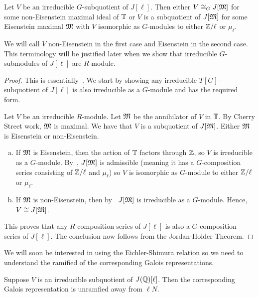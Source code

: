 \documentclass{article}
\begin{document}
\begin{theorem}\label{theorem:irreducible_G_sub}
    Let $V$ be an irreducible $G$-subquotient of $J[\ell]$. Then either $V\cong_G
    J[\mathfrak{M}]$ for some non-Eisenstein maximal ideal of $\mathbb{T}$ or $V$ is a
    subquotient of $J[\mathfrak{M}]$ for some Eisenstein maximal $\mathfrak{M}$ with $V$
    isomorphic as $G$-modules to either $\mathbb{Z}/\ell$ or $\mu_\ell$.

    We will call $V$ non-Eisenstein in the first case and Eisenstein in the
    second case. This terminology will be justified later when we show that
    irreducible $G$-submodules of $J[\ell]$ are $R$-module.
\end{theorem}
\begin{proof}
    This is essentially~\cite[\S 14]{mazur:eisenstein}. We start by showing any
    irreducible $T[G]$-subquotient of $J[\ell]$ is also irreducible as a
    $G$-module and has the required form.

    Let $V$ be an irreducible $R$-module. Let $\mathfrak{M}$ be the annihilator of $V$
    in $\mathbb{T}$. By Cherry Street work, $\mathfrak{M}$ is maximal. We have that $V$ is a
    subquotient of $J[\mathfrak{M}]$. Either $\mathfrak{M}$ is Eisenstein or non-Eisenstein.
    \begin{enumerate}[(a)]
        \item
            If $\mathfrak{M}$ is Eisenstein, then the action of $\mathbb{T}$ factors through
            $\mathbb{Z}$, so $V$ is irreducible as a $G$-module. By~\cite[Proposition
            14.1]{mazur:eisenstein}, $J[\mathfrak{M}]$ is admissible (meaning it has a
            $G$-composition series consisting of $\mathbb{Z}/\ell$ and $\mu_\ell$) so
            $V$ is isomorphic as $G$-module to either $\mathbb{Z}/\ell$ or $\mu_\ell$.
        \item
            If $\mathfrak{M}$ is non-Eisenstein, then by~\cite[Proposition
            14.2]{mazur:eisenstein} $J[\mathfrak{M}]$ is irreducible as a $G$-module.
            Hence, $V\cong J[\mathfrak{M}]$.
    \end{enumerate}
    This proves that any $R$-composition series of $J[\ell]$ is also a
    $G$-composition series of $J[\ell]$. The conclusion now follows from the
    Jordan-Holder Theorem.
\end{proof} 

We will soon be interested in using the Eichler-Shimura relation so we need to
understand the ramified of the corresponding Galois representations.
\begin{corollary}\label{corollary:unramified}
    Suppose $V$ is an irreducible subquotient of $J(\mathbb{Q})[\ell]$. Then the
    corresponding Galois representation is unramfied away from $\ell N$.
\end{corollary}
 
\end{document}
